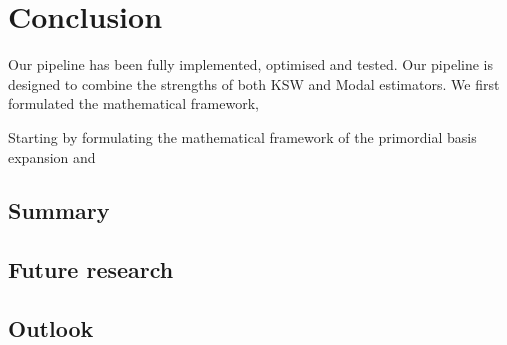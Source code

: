 \chapter{Conclusion}

\ifpdf
    \graphicspath{{Chapter3/Figs/Raster/}{Chapter3/Figs/PDF/}{Chapter3/Figs/}}
\else
    \graphicspath{{Chapter3/Figs/Vector/}{Chapter3/Figs/}}
\fi


Our pipeline has been fully implemented, optimised and tested.
Our pipeline is designed to combine the strengths of both KSW and Modal estimators. We first formulated the mathematical framework, 

Starting by formulating the mathematical framework of the primordial basis expansion and 



\section*{Summary}

\section*{Future research}

\section*{Outlook}